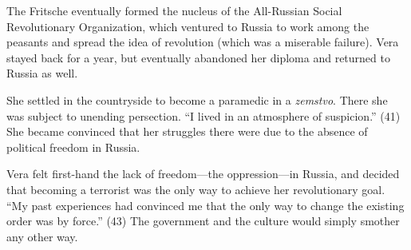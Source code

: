\documentclass[12pt]{article}
\begin{document}
The Fritsche eventually formed the nucleus of the All-Russian Social
Revolutionary Organization, which ventured to Russia to work among the
peasants and spread the idea of revolution (which was a miserable
failure).  Vera stayed back for a year, but eventually abandoned her
diploma and returned to Russia as well.  

She settled in the countryside to become a paramedic in a
\textit{zemstvo}.  There she was subject to unending persection. ``I
lived in an atmosphere of suspicion.'' (41)  She became convinced that
her struggles there were due to the absence of political freedom in
Russia.

Vera felt first-hand the lack of freedom---the oppression---in Russia,
and decided that becoming a terrorist was the only way to achieve her
revolutionary goal. ``My past experiences had convinced me that the only
way to change the existing order was by force.'' (43)  The government
and the culture would simply smother any other way.   
\end{document}
